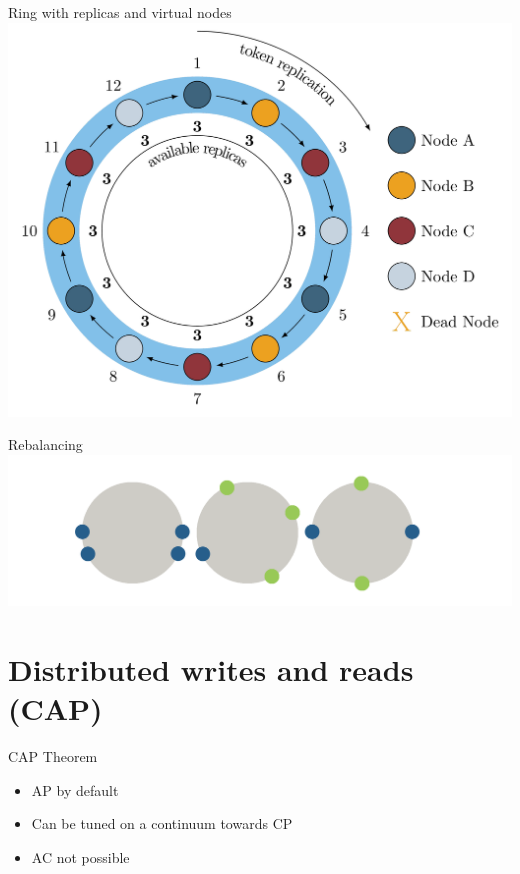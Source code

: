 \documentclass[
  10pt
]{beamer}
\begin{document}
\begin{frame}{Ring with replicas and virtual nodes}
  \includegraphics[width=1.0\textwidth]{resources/replica_ring.png}
\end{frame}

\begin{frame}{Rebalancing}
  \includegraphics[width=1.0\textwidth]{resources/rebalancing.png}
\end{frame}

\section{Distributed writes and reads (CAP)}  %

\begin{frame}{CAP Theorem}
  \begin{itemize}
    \item AP by default
    \item Can be tuned on a continuum towards CP
    \item AC not possible  %
  \end{itemize}
\end{frame}
\end{document}
